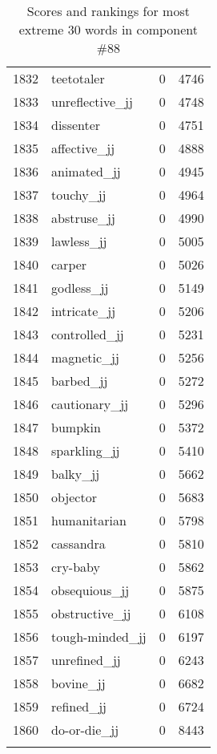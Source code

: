 \begin{longtable}[!htbp]{| rlr@{.}l |}
    1832 & teetotaler & 0 & 4746 \\
    1833 & unreflective\_jj & 0 & 4748 \\
    1834 & dissenter & 0 & 4751 \\
    1835 & affective\_jj & 0 & 4888 \\
    1836 & animated\_jj & 0 & 4945 \\
    1837 & touchy\_jj & 0 & 4964 \\
    1838 & abstruse\_jj & 0 & 4990 \\
    1839 & lawless\_jj & 0 & 5005 \\
    1840 & carper & 0 & 5026 \\
    1841 & godless\_jj & 0 & 5149 \\
    1842 & intricate\_jj & 0 & 5206 \\
    1843 & controlled\_jj & 0 & 5231 \\
    1844 & magnetic\_jj & 0 & 5256 \\
    1845 & barbed\_jj & 0 & 5272 \\
    1846 & cautionary\_jj & 0 & 5296 \\
    1847 & bumpkin & 0 & 5372 \\
    1848 & sparkling\_jj & 0 & 5410 \\
    1849 & balky\_jj & 0 & 5662 \\
    1850 & objector & 0 & 5683 \\
    1851 & humanitarian & 0 & 5798 \\
    1852 & cassandra & 0 & 5810 \\
    1853 & cry-baby & 0 & 5862 \\
    1854 & obsequious\_jj & 0 & 5875 \\
    1855 & obstructive\_jj & 0 & 6108 \\
    1856 & tough-minded\_jj & 0 & 6197 \\
    1857 & unrefined\_jj & 0 & 6243 \\
    1858 & bovine\_jj & 0 & 6682 \\
    1859 & refined\_jj & 0 & 6724 \\
    1860 & do-or-die\_jj & 0 & 8443 \\
    \hline
    \caption{Scores and rankings for most extreme 30 words in component \#88} \\
\end{longtable}
